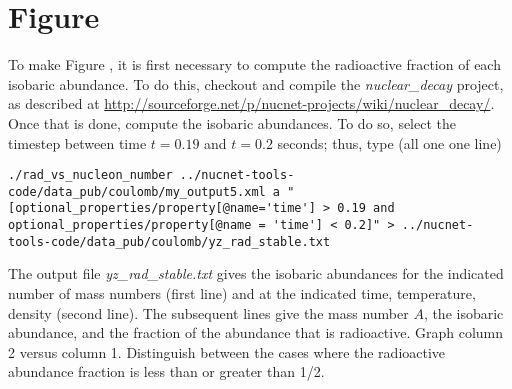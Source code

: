 \section*{Figure }
\hypertarget{sec:yz_rad_stable}{}


\noindent To make Figure , it is first necessary to
compute the radioactive fraction of each isobaric abundance.  To
do this, checkout and compile the {\em nuclear\_decay} project, as
described at
\url{http://sourceforge.net/p/nucnet-projects/wiki/nuclear_decay/}.
Once that is done, compute the isobaric abundances.  To do so, select
the timestep between time $t = 0.19$ and $t = 0.2$ seconds; thus, type
(all one one line)
\begin{verbatim}
./rad_vs_nucleon_number ../nucnet-tools-code/data_pub/coulomb/my_output5.xml a "[optional_properties/property[@name='time'] > 0.19 and optional_properties/property[@name = 'time'] < 0.2]" > ../nucnet-tools-code/data_pub/coulomb/yz_rad_stable.txt
\end{verbatim}
The output file {\em yz\_rad\_stable.txt} gives the isobaric abundances 
for the indicated number of mass numbers (first line) and
at the indicated time, temperature, density (second line).  The subsequent
lines give the mass number $A$, the isobaric abundance, and the fraction
of the abundance that is radioactive.  Graph column 2 versus column 1.
Distinguish between the cases where the radioactive abundance fraction is
less than or greater than 1/2.

\addtocounter{counter}{1}

